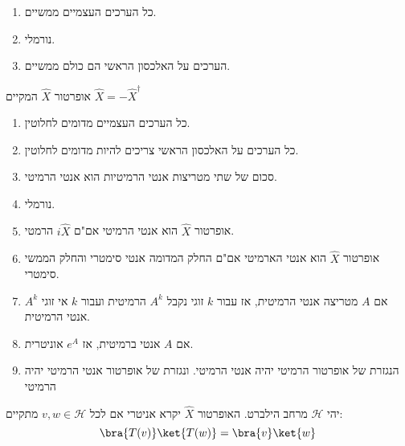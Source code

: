 \documentclass{tstextbook}
\begin{document}
\begin{proposition}
  \begin{enumerate}
    \item כל הערכים העצמיים ממשיים. 


    \item נורמלי. 


    \item הערכים על האלכסון הראשי הם כולם ממשיים. 


  \end{enumerate}
\end{proposition}
\begin{definition}
אופרטור \(\hat{X}\) המקיים \(\hat{X}=-\hat{X}^{\dagger}\)

\end{definition}
\begin{proposition}
  \begin{enumerate}
    \item כל הערכים העצמיים מדומים לחלוטין. 


    \item כל הערכים על האלכסון הראשי צריכים להיות מדומים לחלוטין. 


    \item סכום של שתי מטריצות אנטי הרמיטיות הוא אנטי הרמיטי. 


    \item נורמלי. 


    \item אופרטור \(\hat{X}\) הוא אנטי הרמיטי אם"ם \(i\hat{X}\) הרמטי. 


    \item אופרטור \(\hat{X}\) הוא אנטי הארמיטי אם"ם החלק המדומה אנטי סימטרי והחלק הממשי סימטרי. 


    \item אם \(A\) מטריצה אנטי הרמיטית, אז עבור \(k\) זוגי נקבל \(A^k\) הרמיטית ועבור \(k\) אי זוגי \(A^k\) אנטי הרמיטית. 


    \item אם \(A\) אנטי ברמיטית, אז \(e^A\) אוניטרית. 


    \item הנגזרת של אופרטור הרמיטי יהיה אנטי הרמיטי. ונגזרת של אופרטור אנטי הרמיטי יהיה הרמיטי 


  \end{enumerate}
\end{proposition}
\begin{definition}
יהי \(\mathcal{H}\) מרחב הילברט. האופרטור \(\hat{X}\) יקרא אניטרי אם לכל \(v,w \in \mathcal{H}\) מתקיים:
$$\bra{T(v)}\ket{T(w)} =\bra{v} \ket{w}  $$

\end{definition}
\end{document}
